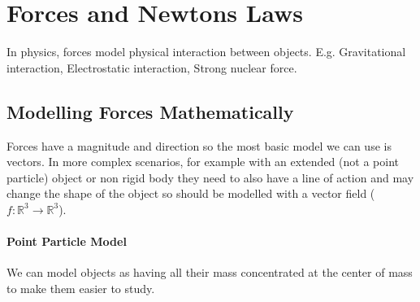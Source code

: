 \documentclass[a4paper,12pt]{article}
\begin{document}
\section*{Forces and Newtons Laws}
In physics, forces model physical interaction between objects. E.g. Gravitational interaction, Electrostatic interaction, Strong nuclear force. \\
\subsection*{Modelling Forces Mathematically}
Forces have a magnitude and direction so the most basic model we can use is vectors. In more complex scenarios, for example with an extended (not a point particle) object or non rigid body they need to also have a line of action and may change the shape of the object so should be modelled with a vector field ($f:\mathbb{R}^3 \to \mathbb{R}^3$). \\
\paragraph*{Point Particle Model}
We can model objects as having all their mass concentrated at the center of mass to make them easier to study.
\end{document}
